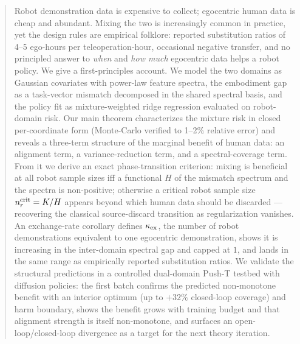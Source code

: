 \begin{abstract}
Robot demonstration data is expensive to collect; egocentric human data is cheap and abundant.
Mixing the two is increasingly common in practice, yet the design rules are empirical folklore: reported substitution ratios of 4--5 ego-hours per teleoperation-hour, occasional negative transfer, and no principled answer to \emph{when} and \emph{how much} egocentric data helps a robot policy.
We give a first-principles account. We model the two domains as Gaussian covariates with power-law feature spectra, the embodiment gap as a task-vector mismatch decomposed in the shared spectral basis, and the policy fit as mixture-weighted ridge regression evaluated on robot-domain risk.
Our main theorem characterizes the mixture risk in closed per-coordinate form (Monte-Carlo verified to 1--2\% relative error) and reveals a three-term structure of the marginal benefit of human data: an alignment term, a variance-reduction term, and a spectral-coverage term.
From it we derive an exact phase-transition criterion: mixing is beneficial at all robot sample sizes iff a functional $H$ of the mismatch spectrum and the spectra is non-positive; otherwise a critical robot sample size $\nr^{\mathrm{crit}} = K/H$ appears beyond which human data should be discarded --- recovering the classical source-discard transition as regularization vanishes.
An exchange-rate corollary defines $\kex$, the number of robot demonstrations equivalent to one egocentric demonstration, shows it is increasing in the inter-domain spectral gap and capped at $1$, and lands in the same range as empirically reported substitution ratios.
We validate the structural predictions in a controlled dual-domain Push-T testbed with diffusion policies: the first batch confirms the predicted non-monotone benefit with an interior optimum (up to $+32\%$ closed-loop coverage) and harm boundary, shows the benefit grows with training budget and that alignment strength is itself non-monotone, and surfaces an open-loop/closed-loop divergence as a target for the next theory iteration.
\end{abstract}
